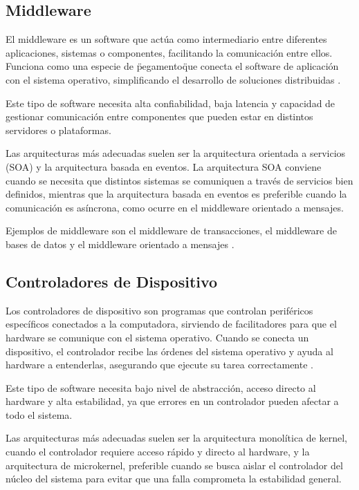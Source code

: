 \documentclass[12pt, letterpaper]{article}
\begin{document}
\subsection{Middleware}
El middleware es un software que actúa como intermediario entre diferentes aplicaciones, sistemas o componentes, facilitando la comunicación entre ellos. Funciona como una especie de \"pegamento\" que conecta el software de aplicación con el sistema operativo, simplificando el desarrollo de soluciones distribuidas \parencite{finoit2025software}.

Este tipo de software necesita alta confiabilidad, baja latencia y capacidad de gestionar comunicación entre componentes que pueden estar en distintos servidores o plataformas.

Las arquitecturas más adecuadas suelen ser la arquitectura orientada a servicios (SOA) y la arquitectura basada en eventos. La arquitectura SOA conviene cuando se necesita que distintos sistemas se comuniquen a través de servicios bien definidos, mientras que la arquitectura basada en eventos es preferible cuando la comunicación es asíncrona, como ocurre en el middleware orientado a mensajes.

Ejemplos de middleware son el middleware de transacciones, el middleware de bases de datos y el middleware orientado a mensajes \parencite{finoit2025software}.

\subsection{Controladores de Dispositivo}
Los controladores de dispositivo son programas que controlan periféricos específicos conectados a la computadora, sirviendo de facilitadores para que el hardware se comunique con el sistema operativo. Cuando se conecta un dispositivo, el controlador recibe las órdenes del sistema operativo y ayuda al hardware a entenderlas, asegurando que ejecute su tarea correctamente \parencite{finoit2025software}.

Este tipo de software necesita bajo nivel de abstracción, acceso directo al hardware y alta estabilidad, ya que errores en un controlador pueden afectar a todo el sistema.

Las arquitecturas más adecuadas suelen ser la arquitectura monolítica de kernel, cuando el controlador requiere acceso rápido y directo al hardware, y la arquitectura de microkernel, preferible cuando se busca aislar el controlador del núcleo del sistema para evitar que una falla comprometa la estabilidad general.
\end{document}
